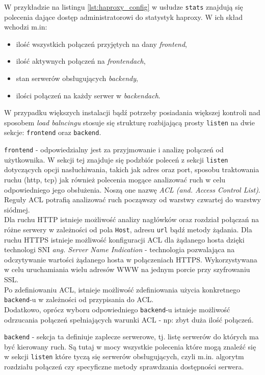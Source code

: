 {\begin{description}
		W przykładzie na listingu \ref{lst:haproxy_config} w usłudze \texttt{stats} znajdują się polecenia dające dostęp administratorowi do statystyk haproxy.
		W ich skład wchodzi m.in:
		\begin{itemize}
			\item ilość wszystkich połączeń przyjętych na dany \textit{frontend},
			\item ilość aktywnych połączeń na \textit{frontendach},
			\item stan serwerów obsługujących \textit{backendy},
			\item ilości połączeń na każdy serwer w \textit{backendach}.
		\end{itemize}
		W przypadku większych instalacji bądź potrzeby posiadania większej kontroli nad sposobem \textit{load balncingu} stosuje się strukturę rozbijającą prosty \texttt{listen} na dwie sekcje: \texttt{frontend} oraz \texttt{backend}.
	\item{\texttt{frontend}} - 
		odpowiedzialny jest za przyjmowanie i analizę połączeń od użytkownika.
		W sekcji tej znajduje się podzbiór poleceń z sekcji \texttt{listen} dotyczących opcji nasłuchiwania, takich jak adres oraz port, sposobu traktowania ruchu (http, tcp) jak również polecenia mogące analizować ruch w celu odpowiedniego jego obsłużenia.
		Noszą one nazwę \textit{ACL (and. Access Control List)}.
		Reguły ACL potrafią analizować ruch począwszy od warstwy czwartej do warstwy siódmej.\\
		Dla ruchu HTTP istnieje możliwość analizy nagłówków oraz rozdział połączań na różne serwery w zależności od pola \texttt{Host}, adresu \texttt{url} bądź metody żądania.
		Dla ruchu HTTPS istnieje możliwość konfiguracji ACL dla żądanego hosta dzięki technologi SNI \textit{ang. Server Name Indication} - technologia pozwalająca na odczytywanie wartości żądanego hosta w połączeniach HTTPS.
		Wykorzystywana w celu uruchamiania wielu adresów WWW na jednym porcie przy szyfrowaniu SSL.\\
		Po zdefiniowaniu ACL, istnieje możliwość zdefiniowania użycia konkretnego \texttt{backend}-u w zależności od przypisania do ACL.\\
		Dodatkowo, oprócz wyboru odpowiedniego \texttt{backend}-u istnieje możliwość odrzucania połączeń spełniających warunki ACL - np: zbyt duża ilość połączeń.
	\item{\texttt{backend}} - sekcja ta definiuje zaplecze serwerowe, tj. listę serwerów do których ma być kierowany ruch.
		Są tutaj w mocy wszystkie polecenia które mogą znaleźć się w sekcji \texttt{listen} które tyczą się serwerów obsługujących, czyli m.in. algorytm rozdziału połączeń czy specyficzne metody sprawdzania dostępności serwera.
\end{description}
}
